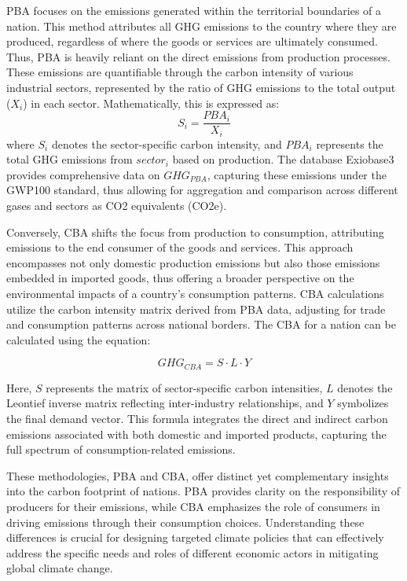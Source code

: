 PBA focuses on the emissions generated within the territorial boundaries of a nation. This method attributes all GHG emissions to the country where they are produced, regardless of where the goods or services are ultimately consumed. Thus, PBA is heavily reliant on the direct emissions from production processes. These emissions are quantifiable through the carbon intensity of various industrial sectors, represented by the ratio of GHG emissions to the total output ($X_i$) in each sector. Mathematically, this is expressed as:
\begin{equation}
    S_i = \frac{{PBA_i}}{X_i}
    \label{eq:S}
    \end{equation}
where $S_i$  denotes the sector-specific carbon intensity, and $PBA_i$ represents the total GHG emissions from $sector_i$ based on production. The database Exiobase3 provides comprehensive data on $GHG_{PBA}$, capturing these emissions under the GWP100 standard, thus allowing for aggregation and comparison across different gases and sectors as CO2 equivalents (CO2e).

Conversely, CBA shifts the focus from production to consumption, attributing emissions to the end consumer of the goods and services. This approach encompasses not only domestic production emissions but also those emissions embedded in imported goods, thus offering a broader perspective on the environmental impacts of a country's consumption patterns. CBA calculations utilize the carbon intensity matrix derived from PBA data, adjusting for trade and consumption patterns across national borders. The CBA for a nation can be calculated using the equation:

\begin{equation}
    {GHG_{CBA}} = S \cdot L \cdot Y
    \label{eq:SLY}
    \end{equation}

Here, $S$ represents the matrix of sector-specific carbon intensities, $L$ denotes the Leontief inverse matrix reflecting inter-industry relationships, and $Y$ symbolizes the final demand vector. This formula integrates the direct and indirect carbon emissions associated with both domestic and imported products, capturing the full spectrum of consumption-related emissions.

These methodologies, PBA and CBA, offer distinct yet complementary insights into the carbon footprint of nations. PBA provides clarity on the responsibility of producers for their emissions, while CBA emphasizes the role of consumers in driving emissions through their consumption choices. Understanding these differences is crucial for designing targeted climate policies that can effectively address the specific needs and roles of different economic actors in mitigating global climate change.
      

